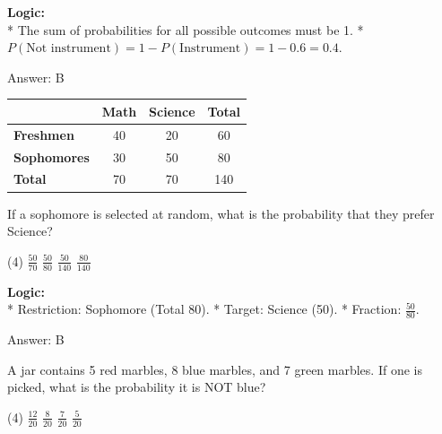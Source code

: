 \documentclass[11pt,paper=a4,answers]{exam}
\begin{document}
\begin{questions}
\begin{solution}
\textbf{Logic:} \\
* The sum of probabilities for all possible outcomes must be 1.
* $P(\text{Not instrument}) = 1 - P(\text{Instrument}) = 1 - 0.6 = 0.4$.

\vspace{30pt}

Answer: \colorbox{yellow!100}{B}
\end{solution}

\vspace{60pt}

\question
\begin{center}
\begin{tabular}{|l|c|c|c|}
\hline
 & \textbf{Math} & \textbf{Science} & \textbf{Total} \\ \hline
\textbf{Freshmen} & 40 & 20 & 60 \\ \hline
\textbf{Sophomores} & 30 & 50 & 80 \\ \hline
\textbf{Total} & 70 & 70 & 140 \\ \hline
\end{tabular}
\end{center}
If a sophomore is selected at random, what is the probability that they prefer Science?
\begin{tasks}(4)
    \task $\frac{50}{70}$
    \task $\frac{50}{80}$
    \task $\frac{50}{140}$
    \task $\frac{80}{140}$
\end{tasks}

\begin{solution}
\textbf{Logic:} \\
* Restriction: Sophomore (Total 80).
* Target: Science (50).
* Fraction: $\frac{50}{80}$.

\vspace{30pt}

Answer: \colorbox{yellow!100}{B}
\end{solution}

\vspace{60pt}

\question
A jar contains 5 red marbles, 8 blue marbles, and 7 green marbles. If one is picked, what is the probability it is NOT blue?
\begin{tasks}(4)
    \task $\frac{12}{20}$
    \task $\frac{8}{20}$
    \task $\frac{7}{20}$
    \task $\frac{5}{20}$
\end{tasks}


\end{questions}
\end{document}
